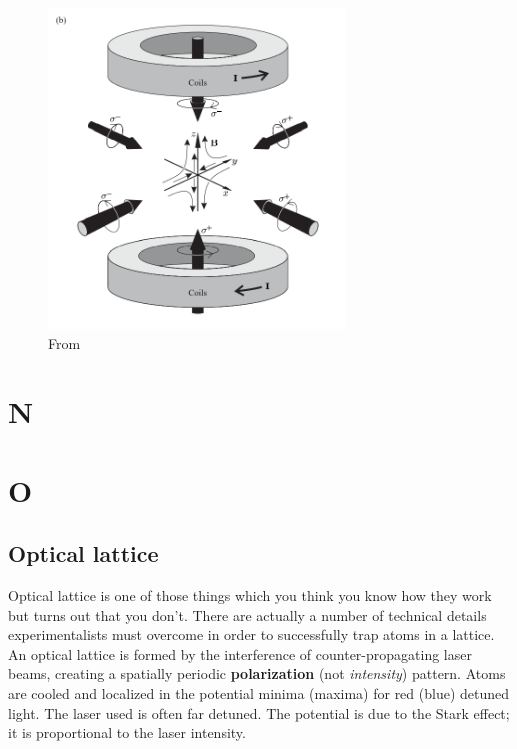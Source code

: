 \documentclass{book}
\theoremstyle{definition}
\begin{document}
\begin{figure}[!htb]
	\centering
	\includegraphics[width=0.7\textwidth]{images/foot_2}
	\caption{From \cite{foot2005atomic}}
\end{figure}


\chapter*{N}
\chapter*{O}



\section*{Optical lattice}



Optical lattice is one of those things which you think you know how they work but turns out that you don't. There are actually a number of technical details experimentalists must overcome in order to successfully trap atoms in a lattice. \\




An optical lattice is formed by the interference of counter-propagating laser beams, creating a spatially periodic \textbf{polarization} (not \textit{intensity}) pattern. Atoms are cooled and localized in the potential minima (maxima) for red (blue) detuned light. The laser used is often far detuned.  The potential is due to the Stark effect; it is proportional to the laser intensity. \\
\end{document}
